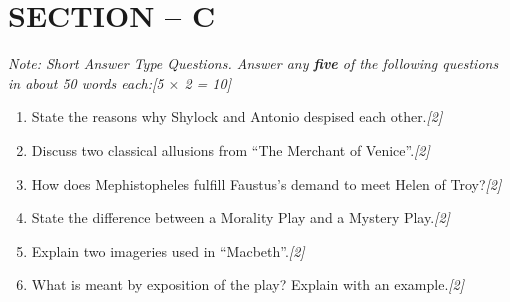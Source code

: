 \documentclass[11pt,a4paper]{article}
\newcommand{\pts}[1]{\hfill \textit{[#1]}}
\begin{document}
\bigskip

\section*{SECTION -- C}
\noindent \textit{Note: Short Answer Type Questions. Answer any \textbf{five} of the following questions in about 50 words each:}\pts{5 $\times$ 2 = 10}

\begin{enumerate}[label=(\alph*),leftmargin=*,itemsep=6pt]

  \item State the reasons why Shylock and Antonio despised each other.\pts{2}
  \item Discuss two classical allusions from ``The Merchant of Venice''.\pts{2}
  \item How does Mephistopheles fulfill Faustus's demand to meet Helen of Troy?\pts{2}
  \item State the difference between a Morality Play and a Mystery Play.\pts{2}
  \item Explain two imageries used in ``Macbeth''.\pts{2}
  \item What is meant by exposition of the play? Explain with an example.\pts{2}

\end{enumerate}
\end{document}
